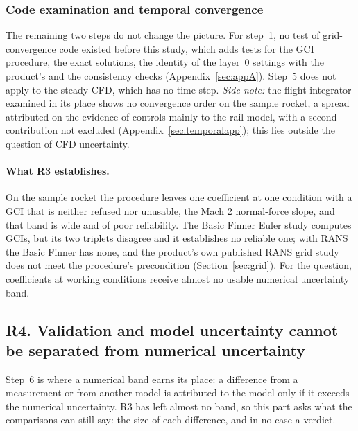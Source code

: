 \documentclass[twocolumn]{labreport}
\begin{document}
\subsubsection{Code examination and temporal convergence}
\label{sec:step1}
\label{sec:temporal}

The remaining two steps do not change the picture.
For step~1, no test of grid-convergence code existed before this study, which adds tests for the GCI procedure, the exact solutions, the identity of the layer~0 settings with the product's and the consistency checks (Appendix~\ref{sec:appA}).
Step~5 does not apply to the steady CFD, which has no time step.
\emph{Side note:} the flight integrator examined in its place shows no convergence order on the sample rocket, a spread attributed on the evidence of controls mainly to the rail model, with a second contribution not excluded (Appendix~\ref{sec:temporalapp}); this lies outside the question of CFD uncertainty.

\paragraph{What R3 establishes.}
On the sample rocket the procedure leaves one coefficient at one condition with a GCI that is neither refused nor unusable, the Mach 2 normal-force slope, and that band is wide and of poor reliability.
The Basic Finner Euler study computes GCIs, but its two triplets disagree and it establishes no reliable one; with RANS the Basic Finner has none, and the product's own published RANS grid study does not meet the procedure's precondition (Section~\ref{sec:grid}).
For the question, coefficients at working conditions receive almost no usable numerical uncertainty band.

\subsection{R4. Validation and model uncertainty cannot be separated from numerical uncertainty}
\label{sec:r4}

Step~6 is where a numerical band earns its place: a difference from a measurement or from another model is attributed to the model only if it exceeds the numerical uncertainty.
R3 has left almost no band, so this part asks what the comparisons can still say: the size of each difference, and in no case a verdict.
\end{document}
